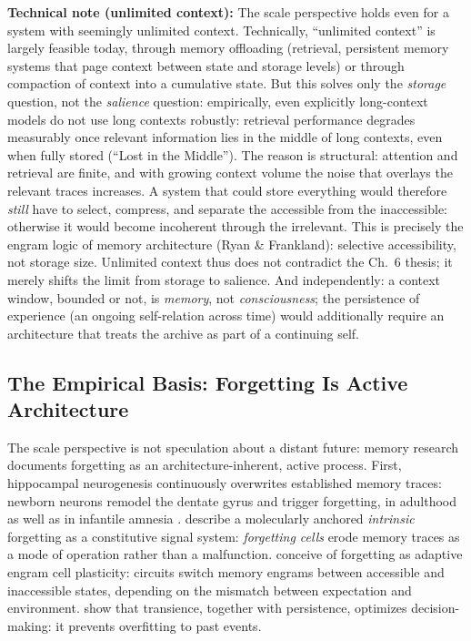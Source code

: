 \documentclass[acmlarge, nonacm]{acmart}
\begin{document}
\textbf{Technical note (unlimited context):} The scale perspective holds even for a system with seemingly unlimited context. Technically, ``unlimited context'' is largely feasible today, through memory offloading (retrieval, persistent memory systems that page context between state and storage levels) or through compaction of context into a cumulative state. But this solves only the \textit{storage} question, not the \textit{salience} question: empirically, even explicitly long-context models do not use long contexts robustly: retrieval performance degrades measurably once relevant information lies in the middle of long contexts, even when fully stored \cite{liu2024} (``Lost in the Middle''). The reason is structural: attention and retrieval are finite, and with growing context volume the noise that overlays the relevant traces increases. A system that could store everything would therefore \textit{still} have to select, compress, and separate the accessible from the inaccessible: otherwise it would become incoherent through the irrelevant. This is precisely the engram logic of memory architecture (Ryan \& Frankland): selective accessibility, not storage size. Unlimited context thus does not contradict the Ch.~6 thesis; it merely shifts the limit from storage to salience. And independently: a context window, bounded or not, is \textit{memory}, not \textit{consciousness}; the persistence of experience (an ongoing self-relation across time) would additionally require an architecture that treats the archive as part of a continuing self.

\subsection{The Empirical Basis: Forgetting Is Active Architecture}

The scale perspective is not speculation about a distant future: memory research documents forgetting as an architecture-inherent, active process. First, hippocampal neurogenesis continuously overwrites established memory traces: newborn neurons remodel the dentate gyrus and trigger forgetting, in adulthood as well as in infantile amnesia \cite{akers2014}. \citet{davis_zhong2017} describe a molecularly anchored \textit{intrinsic} forgetting as a constitutive signal system: \textit{forgetting cells} erode memory traces as a mode of operation rather than a malfunction. \citet{ryan2022} conceive of forgetting as adaptive engram cell plasticity: circuits switch memory engrams between accessible and inaccessible states, depending on the mismatch between expectation and environment. \citet{richards_frankland2017} show that transience, together with persistence, optimizes decision-making: it prevents overfitting to past events.
\end{document}
